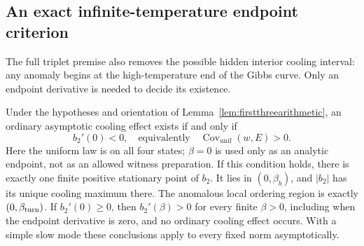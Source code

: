 \subsection{An exact infinite-temperature endpoint criterion}
\label{sec:tripletendpoint}
The full triplet premise also removes the possible hidden interior cooling
interval: any anomaly begins at the high-temperature end of the Gibbs curve.
Only an endpoint derivative is needed to decide its existence.

\begin{corollary}
\label{cor:tripletendpoint}
Under the hypotheses and orientation of
Lemma~\ref{lem:firstthreearithmetic}, an ordinary asymptotic cooling effect
exists if and only if
\[
b_2'(0)<0,
\quad\text{equivalently}\quad
\operatorname{Cov}_{\mathrm{unif}}(w,E)>0.
\]
Here the uniform law is on all four states; $\beta=0$ is used only as an
analytic endpoint, not as an allowed witness preparation. If this condition
holds, there is exactly one finite positive stationary point of $b_2$.
It lies in $(0,\beta_b)$, and $|b_2|$ has its unique cooling maximum there.
The anomalous local ordering region is exactly $(0,\beta_{\rm turn})$.
If $b_2'(0)\geq0$, then $b_2'(\beta)>0$ for every finite $\beta>0$,
including when the endpoint derivative is zero, and no ordinary cooling
effect occurs. With a simple slow mode these conclusions apply to every
fixed norm asymptotically.
\end{corollary}
